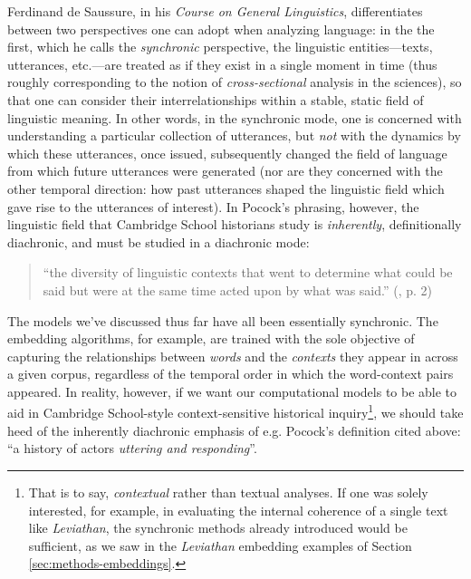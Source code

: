 \documentclass[11pt]{article}
\begin{document}

Ferdinand de Saussure, in his \textit{Course on General Linguistics}, differentiates between two perspectives one can adopt when analyzing language: in the the first, which he calls the \textit{synchronic} perspective, the linguistic entities---texts, utterances, etc.---are treated as if they exist in a single moment in time (thus roughly corresponding to the notion of \textit{cross-sectional} analysis in the sciences), so that one can consider their interrelationships within a stable, static field of linguistic meaning. In other words, in the synchronic mode, one is concerned with understanding a particular collection of utterances, but \textit{not} with the dynamics by which these utterances, once issued, subsequently changed the field of language from which future utterances were generated (nor are they concerned with the other temporal direction: how past utterances shaped the linguistic field which gave rise to the utterances of interest). In Pocock's phrasing, however, the linguistic field that Cambridge School historians study is \textit{inherently}, definitionally diachronic, and must be studied in a diachronic mode:
\begin{quote}
``the diversity of linguistic contexts that went to determine what could be said but were at the same time acted upon by what was said.'' (\cite{pocock_virtue_1985}, p. 2)
\end{quote}

The models we've discussed thus far have all been essentially synchronic. The embedding algorithms, for example, are trained with the sole objective of capturing the relationships between \textit{words} and the \textit{contexts} they appear in across a given corpus, regardless of the temporal order in which the word-context pairs appeared. In reality, however, if we want our computational models to be able to aid in Cambridge School-style context-sensitive historical inquiry\footnote{That is to say, \textit{contextual} rather than textual analyses. If one was solely interested, for example, in evaluating the internal coherence of a single text like \textit{Leviathan}, the synchronic methods already introduced would be sufficient, as we saw in the \textit{Leviathan} embedding examples of Section \ref{sec:methods-embeddings}.}, we should take heed of the inherently diachronic emphasis of e.g. Pocock's definition cited above: ``a history of actors \textit{uttering and responding}''.
\end{document}
